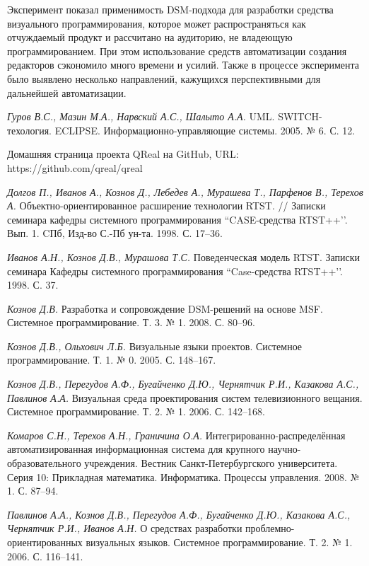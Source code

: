 \documentclass[a4paper]{article}
\begin{document}
Эксперимент показал применимость DSM-подхода для разработки средства визуального программирования, которое может распространяться как отчуждаемый продукт и рассчитано на аудиторию, не владеющую программированием. При этом использование средств автоматизации создания редакторов сэкономило много времени и усилий. Также в процессе эксперимента было выявлено несколько направлений, кажущихся перспективными для дальнейшей автоматизации.

\begin{thebibliography}{9001}

   \emph{Гуров В.С., Мазин М.А., Нарвский А.С., Шалыто А.А.} UML. SWITCH-техология. ECLIPSE. Информационно-управляющие системы. 2005. № 6. С. 12.

   Домашняя страница проекта QReal на GitHub, URL: https://github.com/qreal/qreal 

   \emph{Долгов П., Иванов А., Кознов Д., Лебедев А., Мурашева Т., Парфенов В., Терехов А.} Объектно-ориентированное расширение технологии RTST. // Записки семинара кафедры системного программирования ``CASE-средства RTST++’’. Вып. 1. CПб, Изд-во С.-Пб ун-та. 1998. С. 17--36.

   \emph{Иванов А.Н., Кознов Д.В., Мурашова Т.С.} Поведенческая модель RTST. Записки семинара Кафедры системного программирования ``Case-средства RTST++’’. 1998. С. 37.

   \emph{Кознов Д.В.} Разработка и сопровождение DSM-решений на основе MSF. Системное программирование. Т. 3. № 1. 2008. С. 80--96.

   \emph{Кознов Д.В., Ольхович Л.Б.} Визуальные языки проектов. Системное программирование. Т. 1. № 0. 2005. С. 148--167.

   \emph{Кознов Д.В., Перегудов А.Ф., Бугайченко Д.Ю., Чернятчик Р.И., Казакова А.С., Павлинов А.А.} Визуальная среда проектирования систем телевизионного вещания. Системное программирование. Т. 2. № 1. 2006. С. 142--168.

   \emph{Комаров С.Н., Терехов А.Н., Граничина О.А.} Интегрированно-распределённая автоматизированная информационная система для крупного научно-образовательного учреждения. Вестник Санкт-Петербургского университета. Серия 10: Прикладная математика. Информатика. Процессы управления. 2008. № 1. С. 87--94. 

   \emph{Павлинов А.А., Кознов Д.В., Перегудов А.Ф., Бугайченко Д.Ю., Казакова А.С., Чернятчик Р.И., Иванов А.Н.} О средствах разработки проблемно-ориентированных визуальных языков. Системное программирование. Т. 2. № 1. 2006. С. 116--141.


\end{thebibliography}
\end{document}
